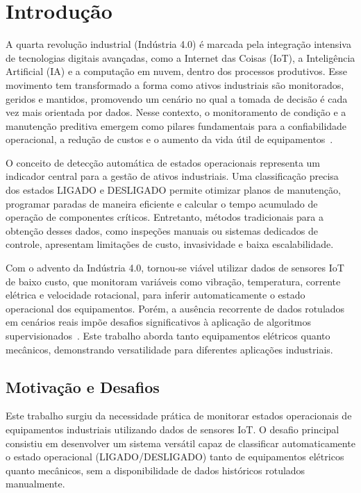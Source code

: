 \chapter{Introdução}
\label{chap:introducao}

A quarta revolução industrial (Indústria 4.0) é marcada pela integração intensiva de tecnologias digitais avançadas, como a Internet das Coisas (IoT), a Inteligência Artificial (IA) e a computação em nuvem, dentro dos processos produtivos. Esse movimento tem transformado a forma como ativos industriais são monitorados, geridos e mantidos, promovendo um cenário no qual a tomada de decisão é cada vez mais orientada por dados. Nesse contexto, o monitoramento de condição e a manutenção preditiva emergem como pilares fundamentais para a confiabilidade operacional, a redução de custos e o aumento da vida útil de equipamentos~\cite{jardine2006review}.

O conceito de detecção automática de estados operacionais representa um indicador central para a gestão de ativos industriais. Uma classificação precisa dos estados LIGADO e DESLIGADO permite otimizar planos de manutenção, programar paradas de maneira eficiente e calcular o tempo acumulado de operação de componentes críticos. Entretanto, métodos tradicionais para a obtenção desses dados, como inspeções manuais ou sistemas dedicados de controle, apresentam limitações de custo, invasividade e baixa escalabilidade.

Com o advento da Indústria 4.0, tornou-se viável utilizar dados de sensores IoT de baixo custo, que monitoram variáveis como vibração, temperatura, corrente elétrica e velocidade rotacional, para inferir automaticamente o estado operacional dos equipamentos. Porém, a ausência recorrente de dados rotulados em cenários reais impõe desafios significativos à aplicação de algoritmos supervisionados~\cite{cascante2021revisiting}. Este trabalho aborda tanto equipamentos elétricos quanto mecânicos, demonstrando versatilidade para diferentes aplicações industriais.

\section{Motivação e Desafios}

Este trabalho surgiu da necessidade prática de monitorar estados operacionais de equipamentos industriais utilizando dados de sensores IoT. O desafio principal consistiu em desenvolver um sistema versátil capaz de classificar automaticamente o estado operacional (LIGADO/DESLIGADO) tanto de equipamentos elétricos quanto mecânicos, sem a disponibilidade de dados históricos rotulados manualmente.

